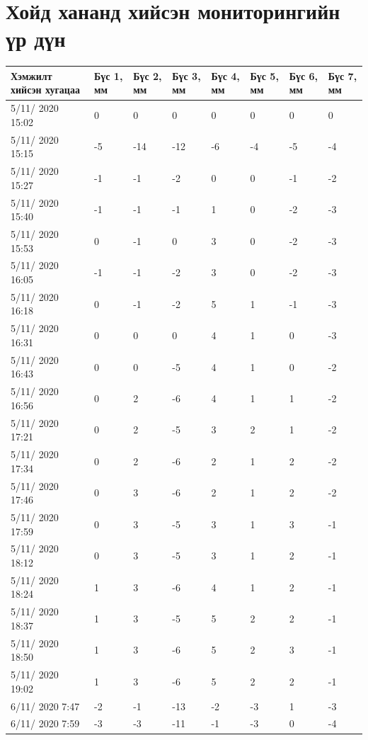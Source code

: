 \chapter{Хойд хананд хийсэн мониторингийн үр дүн} %

\label{AppendixB} %
\pagecolor{white}

\begin{table}[h]
    \centering
    \begin{tabular}{|p{3cm}|p{1cm}|p{1cm}|p{1cm}|p{1cm}|p{1cm}|p{1cm}|p{1cm}|}
         \hline
     Хэмжилт хийсэн хугацаа & Бүс 1, мм&	Бүс 2, мм&	Бүс 3, мм&	Бүс 4, мм&	Бүс 5, мм&	Бүс 6, мм&	Бүс 7, мм  \\ \hline
5/11/ 2020 15:02&	0&	0&	0&	0&	0&	0&	0 \\ \hline
5/11/ 2020 15:15&	-5&	-14&-12&-6&	-4&	-5&	-4 \\ \hline
5/11/ 2020 15:27&	-1&	-1&	-2&	0&	0&	-1&	-2 \\ \hline
5/11/ 2020 15:40&	-1&	-1&	-1&	1&	0&	-2&	-3 \\ \hline
5/11/ 2020 15:53&	0&	-1&	0&	3&	0&	-2&	-3 \\ \hline
5/11/ 2020 16:05&	-1&	-1&	-2&	3&	0&	-2&	-3 \\ \hline
5/11/ 2020 16:18&	0&	-1&	-2&	5&	1&	-1&	-3 \\ \hline
5/11/ 2020 16:31&	0&	0&	0&	4&	1&	0&	-3 \\ \hline
5/11/ 2020 16:43&	0&	0&	-5&	4&	1&	0&	-2 \\ \hline
5/11/ 2020 16:56&	0&	2&	-6&	4&	1&	1&	-2 \\ \hline
5/11/ 2020 17:21&	0&	2&	-5&	3&	2&	1&	-2 \\ \hline
5/11/ 2020 17:34&	0&	2&	-6&	2&	1&	2&	-2 \\ \hline
5/11/ 2020 17:46&	0&	3&	-6&	2&	1&	2&	-2 \\ \hline
5/11/ 2020 17:59&	0&	3&	-5&	3&	1&	3&	-1 \\ \hline
5/11/ 2020 18:12&	0&	3&	-5&	3&	1&	2&	-1 \\ \hline
5/11/ 2020 18:24&	1&	3&	-6&	4&	1&	2&	-1 \\ \hline
5/11/ 2020 18:37&	1&	3&	-5&	5&	2&	2&	-1 \\ \hline
5/11/ 2020 18:50&	1&	3&	-6&	5&	2&	3&	-1 \\ \hline
5/11/ 2020 19:02&	1&	3&	-6&	5&	2&	2&	-1 \\ \hline
6/11/ 2020 7:47&	-2&	-1&	-13&-2&	-3&	1&	-3 \\ \hline
6/11/ 2020 7:59&	-3&	-3&	-11&-1&	-3&	0&	-4 \\ \hline

\end{tabular}
\end{table}
